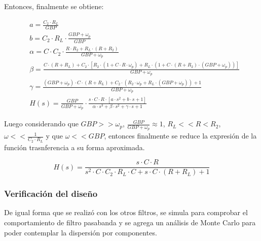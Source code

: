 Entonces, finalmente se obtiene:

\begin{align*}
    & a = \frac{C_2 \cdot R_L}{GBP} \\
    & b = C_2 \cdot R_L \cdot \frac{GBP + \omega_p}{GBP}\\
    & \alpha = C \cdot C_2 \cdot \frac{R \cdot R_2 + R_L \cdot(R + R_2)}{GBP + \omega_p}\\
    & \beta = \frac{C \cdot (R + R_L) + C_2 \cdot \left[ R_2 \cdot (1 + C \cdot R \cdot \omega_p) + R_L \cdot (1 + C \cdot (R + R_2) \cdot (GBP + \omega_p)) \right]}{GBP + \omega_p} \\
    & \gamma = \frac{(GBP + \omega_p) \cdot C \cdot (R +R_L) + C_2 \cdot (R_2 \cdot \omega_p + R_L \cdot(GBP + \omega_p)) + 1}{GBP + \omega_p}\\
    & H(s) = \frac{GBP}{GBP + \omega_p} \cdot
    \frac{s \cdot C \cdot R \cdot \left[ a \cdot s^{2} + b \cdot s + 1 \right]}
    {\alpha \cdot s^{3} + \beta \cdot s^{2} + \gamma \cdot s + 1}
\end{align*}

Luego considerando que $GBP >> \omega_p$, $\frac{GBP}{GBP + \omega_p} \approx 1$, $R_L << R < R_2$, $\omega << \frac{1}{C_2 \cdot R_L}$ y que $\omega << GBP$, entonces finalmente
se reduce la expresi\'on de la funci\'on trasnferencia a su forma aproximada.

\begin{equation}
    H(s) = \frac{s \cdot C \cdot R}{s^{2} \cdot C \cdot C_2 \cdot R_L \cdot C + s \cdot C \cdot (R + R_L) + 1}
\end{equation}

\subsubsection{Verificaci\'on del dise\~no}
De igual forma que se realiz\'o con los otros filtros, se simula para comprobar el comportamiento de filtro pasabanda y se agrega un an\'alisis de Monte Carlo para poder
contemplar la dispersi\'on por componentes.

